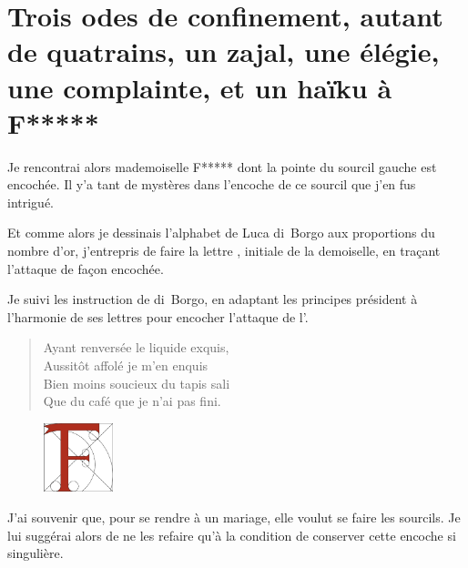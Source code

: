 \section*{Trois odes de confinement, autant de quatrains, un zajal, une élégie, une complainte, et un haïku à F*****}

\begin{prose}
Je rencontrai alors mademoiselle F***** dont la pointe du sourcil gauche est encochée. Il y’a tant de mystères dans l’encoche de ce sourcil que j’en fus intrigué.

Et comme alors je dessinais l’alphabet de Luca di~Borgo aux proportions du nombre d’or, j’entrepris de faire la lettre , initiale de la demoiselle, en traçant l’attaque de façon encochée.

Je suivi les instruction de di~Borgo, en adaptant les principes président à l’harmonie de ses lettres pour encocher l’attaque de l’.
\end{prose}




\begin{verse}
%
Ayant renversée le liquide exquis,\\
Aussitôt affolé je m’en enquis\\
Bien moins soucieux du tapis sali\\
Que du café que je n’ai pas fini.
\end{verse}

\begin{figure}[h]
\centering
\includegraphics[height=2cm]{F.pdf}
\captionsetup{labelformat=empty}
\caption[Lettre  à l’attaque encochée]{}
\end{figure}



\begin{prose}
J’ai souvenir que, pour se rendre à un mariage, elle voulut se faire les sourcils. Je lui suggérai alors de ne les refaire qu’à la condition de conserver cette encoche si singulière.
\end{prose}

